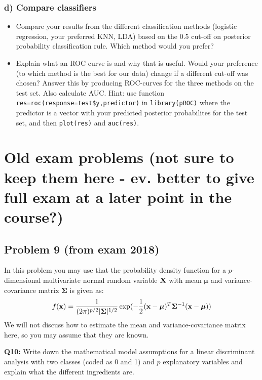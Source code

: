\documentclass[]{article}
\providecommand{\tightlist}{%
  \setlength{\itemsep}{0pt}\setlength{\parskip}{0pt}}
\begin{document}
\subsubsection{d) Compare classifiers}\label{d-compare-classifiers}

\begin{itemize}
\tightlist
\item
  Compare your results from the different classification methods
  (logistic regression, your preferred KNN, LDA) based on the 0.5
  cut-off on posterior probability classification rule. Which method
  would you prefer?
\item
  Explain what an ROC curve is and why that is useful. Would your
  preference (to which method is the best for our data) change if a
  different cut-off was chosen? Answer this by producing ROC-curves for
  the three methods on the test set. Also calculate AUC. Hint: use
  function \texttt{res=roc(response=test\$y,predictor)} in
  \texttt{library(pROC)} where the predictor is a vector with your
  predicted posterior probabilites for the test set, and then
  \texttt{plot(res)} and \texttt{auc(res)}.
\end{itemize}

\section{Old exam problems (not sure to keep them here - ev. better to
give full exam at a later point in the
course?)}\label{old-exam-problems-not-sure-to-keep-them-here---ev.-better-to-give-full-exam-at-a-later-point-in-the-course}

\subsection{Problem 9 (from exam 2018)}\label{problem-9-from-exam-2018}

In this problem you may use that the probability density function for a
\(p\)-dimensional multivariate normal random variable \({\bf X}\) with
mean \({\boldsymbol \mu}\) and variance-covariance matrix
\({\boldsymbol \Sigma}\) is given as:
\[f({\bf x}) = \frac{1}{(2 \pi)^{p/2}|\boldsymbol{\Sigma}|^{1/2}}\exp({-\frac{1}{2}({\bf x}-\boldsymbol\mu)^T \boldsymbol{\Sigma}^{-1}({\bf x}-\boldsymbol\mu)})\]
We will not discuss how to estimate the mean and variance-covariance
matrix here, so you may assume that they are known.

\textbf{Q10:} Write down the mathematical model assumptions for a linear
discriminant analysis with two classes (coded as 0 and 1) and \(p\)
explanatory variables and explain what the different ingredients are.
\end{document}
